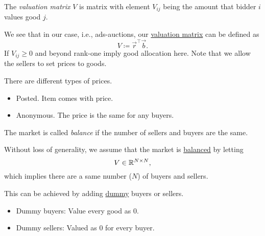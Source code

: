 \begin{definition}\label{def:valuation-matrix}
	The \emph{valuation matrix} \(V\) is matrix with element \(V_{ij}\) being the amount that bidder \(i\) values good \(j\).
\end{definition}

We see that in our case, i.e., ads-auctions, our \hyperref[def:valuation-matrix]{valuation matrix} can be defined as
\[
	V \coloneqq \vec{r} ^{\top} \vec{b}.
\]
If \(V_{ij}\geq 0\) and beyond rank-one imply good allocation here. Note that we allow the sellers to set prices to goods.
\begin{remark}
	There are different types of prices.
	\begin{itemize}
		\item \label{rmk:posted} Posted. Item comes with price.
		\item \label{rmk:anonymous} Anonymous. The price is the same for any buyers.
	\end{itemize}
\end{remark}

\begin{definition}[Balance]\label{def:balance}
	The market is called \emph{balance} if the number of sellers and buyers are the same.
\end{definition}

Without loss of generality, we assume that the market is \hyperref[def:balance]{balanced} by letting
\[
	V\in \mathbb{\MakeUppercase{R}}^{N\times N},
\]
which implies there are a same number (\(N\)) of buyers and sellers.

\begin{remark}
	This can be achieved by adding \underline{dummy} buyers or sellers.
	\begin{itemize}
		\item Dummy buyers: Value every good as \(0\).
		\item Dummy sellers: Valued as \(0\) for every buyer.
	\end{itemize}
\end{remark}

